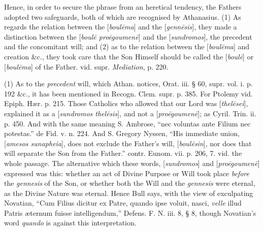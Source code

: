Hence, in order to secure the phrase from an
heretical tendency, the Fathers adopted two safeguards, both of which
are recognised by Athanasius. (1) As regards the relation between the
[\emph{boul\={e}ma}] and the [\emph{genn\={e}sis}], they made a
distinction between the [\emph{boul\={e} pro\={e}goumen\={e}}]
and the [\emph{sundromos}], the precedent and the concomitant will;
and (2) as to the relation between the [\emph{boul\={e}ma}] and
creation \&c., they took care that the Son Himself should be called
the [\emph{boul\={e}}] or [\emph{boul\={e}ma}] of the Father.
vid. supr. \emph{Mediation}, p. 220.

(1) As to the \emph{precedent} will, which Athan.
notices, Orat. iii. § 60, supr. vol. i. p. 192 \&c., it has been
mentioned in Recogn. Clem. supr. p. 385. For Ptolemy vid. Epiph. Hær.
p. 215. Those Catholics who allowed that our Lord was [\emph{thel\={e}sei}],
explained it as a [\emph{sundromos thel\={e}sis}], and not a [\emph{pro\={e}goumen\={e}}];
as Cyril. Trin. ii. p. 450. And with the same meaning S. Ambrose,
“nec voluntas ante Filium nec potestas.” de Fid. v. n. 224. And S.
Gregory Nyssen, “His immediate union, [\emph{amesos sunapheia}],
does not exclude the Father’s will, [\emph{boul\={e}sin}], nor
does that will separate the Son from the Father.” contr. Eunom. vii.
p. 206, 7. vid. the whole passage. The alternative which these words,
[\emph{sundromos}] and [\emph{pro\={e}goumen\={e}}] expressed
was this: whether an act of Divine Purpose or Will took place \emph{before}
the \emph{gennesis} of the Son, or whether both the Will and the \emph{gennesis}
were eternal, as the Divine Nature was eternal. Hence Bull says, with
the view of exculpating Novatian, “Cum Filius dicitur ex Patre,
quando ipse voluit, nasci, \emph{velle} illud Patris æternum
fuisse intelligendum,” Defens. F. N. iii. 8, § 8, though
Novatian’s word \emph{quando} is against this interpretation.

